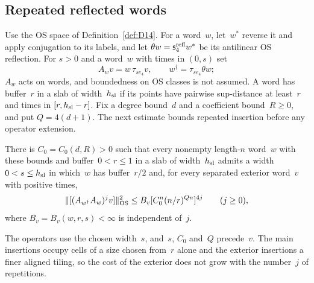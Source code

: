 \subsection{Repeated reflected words}\label{sec:partII-F.5}

Use the OS space of Definition~\ref{def:D14}. For a word~$w$, let~$w^*$ reverse it and apply conjugation to its labels, and let $\theta w=\mathsf s_4^{\rm refl}w^*$ be its antilinear OS reflection. For $s>0$ and a word~$w$ with times in $(0,s)$ set
\begin{equation*}
A_wv=w\,\tau_{se_4}v,\qquad
w^\dagger=\tau_{se_4}\theta w;
\end{equation*}
$A_w$ acts on words, and boundedness on OS classes is not assumed. A word has buffer~$r$ in a slab of width~$h_{\rm sl}$ if its points have pairwise sup-distance at least~$r$ and times in $[r,h_{\rm sl}-r]$. Fix a degree bound~$d$ and a coefficient bound~$R\ge0$, and put $Q=4(d+1)$. The next estimate bounds repeated insertion before any operator extension.
\begin{lemma}\label{lem:F4}
There is $C_0=C_0(d,R)>0$ such that every nonempty length-$n$ word~$w$ with these bounds and buffer~$0<r\le1$ in a slab of width~$h_{\rm sl}$ admits a width $0<s\le h_{\rm sl}$ in which~$w$ has buffer~$r/2$ and, for every separated exterior word~$v$ with positive times,
\begin{equation*}
\|[(A_{w^\dagger}A_w)^jv]\|_{\rm OS}^2
\le B_v[C_0^n(n/r)^{Qn}]^{4j}\qquad(j\ge0),
\end{equation*}
where $B_v=B_v(w,r,s)<\infty$ is independent of~$j$.
\end{lemma}
The operators use the chosen width~$s$, and~$s$, $C_0$ and~$Q$ precede~$v$. The main insertions occupy cells of a size chosen from~$r$ alone and the exterior insertions a finer aligned tiling, so the cost of the exterior does not grow with the number~$j$ of repetitions.
